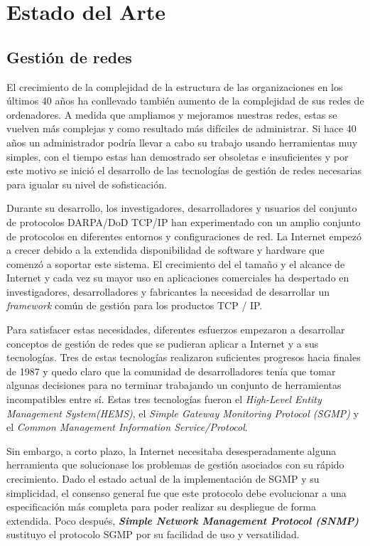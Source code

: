 \chapter{Estado del Arte\label{sec:estado_del_arte}}

\section{Gestión de redes\label{sec:gestion_redes}}
El crecimiento de la complejidad de la estructura de las organizaciones en los últimos 40 años ha 
conllevado también aumento de la complejidad de sus redes de ordenadores. A medida que ampliamos y 
mejoramos nuestras redes, estas se vuelven más complejas y como resultado más difíciles de 
administrar. Si hace 40 años un administrador podría llevar a cabo su trabajo usando herramientas 
muy simples, con el tiempo estas han demostrado ser obsoletas e insuficientes y por este motivo se 
inició el desarrollo de las tecnologías de gestión de redes necesarias para igualar su nivel de 
sofisticación.

Durante su desarrollo, los investigadores, desarrolladores y usuarios del conjunto de protocolos 
DARPA/DoD TCP/IP han experimentado con un amplio conjunto de protocolos en diferentes entornos y 
configuraciones de red. La Internet empezó a crecer debido a la extendida disponibilidad de software
y hardware que comenzó a soportar este sistema. El crecimiento del el tamaño y el alcance de Internet
y cada vez su mayor uso en aplicaciones comerciales ha despertado en investigadores, desarrolladores y
fabricantes la necesidad de desarrollar un \textit{framework} común de gestión para los productos
TCP / IP.

Para satisfacer estas necesidades, diferentes esfuerzos empezaron a desarrollar conceptos de gestión
de redes que se pudieran aplicar a Internet y a sus tecnologías. Tres de estas tecnologías realizaron
suficientes progresos hacia finales de 1987 y quedo claro que la comunidad de desarrolladores tenía que
tomar algunas decisiones para no terminar trabajando un conjunto de herramientas incompatibles entre sí.
Estas tres tecnologías fueron el \textit{High-Level Entity Management System(HEMS)}, el \textit{Simple
Gateway Monitoring Protocol (SGMP)} y el \textit{Common Management Information Service/Protocol}.

Sin embargo, a corto plazo, la Internet necesitaba desesperadamente alguna herramienta que solucionase
los problemas de gestión asociados con su rápido crecimiento. Dado el estado actual de la implementación
de SGMP y su simplicidad, el consenso general fue que este protocolo debe evolucionar a una especificación
más completa para poder realizar su despliegue de forma extendida. Poco después, \textbf{\textit{Simple 
Network Management Protocol (SNMP) }} sustituyo el protocolo SGMP por su facilidad de uso y versatilidad.

